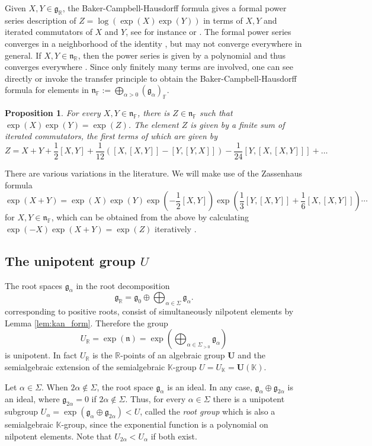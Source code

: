 \documentclass[12pt]{amsart}
\newcommand{\F}{\mathbb{F} }
\newcommand{\R}{\mathbb{R} }
\newcommand{\K}{\mathbb{K}}
\newcommand{\frakg}{\mathfrak{g}}
\newcommand{\frakn}{\mathfrak{n}}
\newcommand{\bU}{\mathbf{U}}
\numberwithin{equation}{section}
\newtheorem{proposition}[theorem]{Proposition}
\theoremstyle{remark} %
\begin{document}
Given $X,Y \in \frakg_\R$, the Baker-Campbell-Hausdorff formula gives a formal power series description of $Z = \log(\exp(X)\exp(Y))$ in terms of $X,Y$ and iterated commutators of $X$ and $Y$, see for instance \cite[Proposition V.1]{Jac79} or \cite{Mag54}. The formal power series converges in a neighborhood of the identity \cite[Theorem 3.1 in X.3]{Hoch65}, %
but may not converge everywhere in general. If $X,Y \in \frakn_\R$, then the power series is given by a polynomial and thus converges everywhere \cite{Wei63}. Since only finitely many terms are involved, one can see directly or invoke the transfer principle to obtain the Baker-Campbell-Hausdorff formula for elements in $\frakn_\F := \bigoplus_{\alpha >0} (\frakg_\alpha)_\F$.
\begin{proposition}\label{prop:BCH}
	For every $X,Y \in \frakn_\F$, there is $Z \in \frakn_\F$ such that $\exp(X)\exp(Y) = \exp(Z)$. The element $Z$ is given by a finite sum of iterated commutators, the first terms of which are given by
	$$
	Z = X + Y + \frac{1}{2}[X,Y] + \frac{1}{12}\left(\left[X,\left[X,Y\right]\right]- \left[Y, \left[Y,X\right]\right]\right) - \frac{1}{24} \left[Y,\left[X,\left[X,Y\right]\right]\right] + \ldots
	$$ 
\end{proposition}
There are various variations in the literature. We will make use of the Zassenhaus formula
$$
\exp(X+Y) = \exp(X) \exp(Y) \exp\left(-\frac{1}{2}\left[X,Y\right]\right)\exp \left( \frac{1}{3} [Y,[X,Y]] + \frac{1}{6}[X,[X,Y]] \right) \cdots 
$$
for $X,Y \in \frakn_\F$, which can be obtained from the above by calculating $\exp(-X)\exp(X+Y) = \exp(Z) $ iteratively \cite{Mag54}.

\subsection{The unipotent group $U$}\label{sec:U}

The root spaces $\frakg_\alpha$ in the root decomposition
$$
\frakg_\R = \frakg_0 \oplus \bigoplus_{\alpha \in \Sigma} \frakg_\alpha.
$$
corresponding to positive roots, consist of simultaneously nilpotent elements by Lemma \ref{lem:kan_form}. Therefore the group 
$$
U_\R = \exp(\frakn) = \exp\left( \bigoplus_{\alpha \in \Sigma_{>0}} \frakg_\alpha \right)
$$
is unipotent. In fact $U_\R$ is the $\R$-points of an algebraic group $\bU$ and the semialgebraic extension of the semialgebraic $\K$-group $U = U_\K = \bU(\K)$.

Let $\alpha \in \Sigma$. When $2\alpha \notin \Sigma$, the root space $\frakg_\alpha$ is an ideal. In any case, $\frakg_\alpha \oplus \frakg_{2\alpha}$ is an ideal, where $\frakg_{2\alpha} = 0$ if $2\alpha \notin \Sigma$. Thus, for every $\alpha \in \Sigma$ there is a unipotent subgroup $U_\alpha = \exp(\frakg_\alpha \oplus \frakg_{2\alpha}) < U$, called the \emph{root group} which is also a semialgebraic $\K$-group, since the exponential function is a polynomial on nilpotent elements. Note that $U_{2\alpha} < U_\alpha$ if both exist. 
\end{document}
